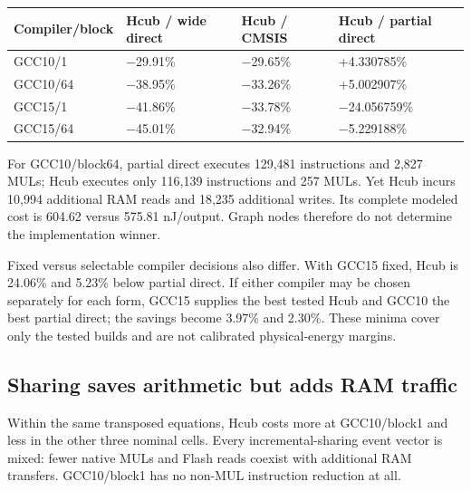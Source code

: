 \documentclass[conference]{IEEEtran}
\makeatletter
\newenvironment{inlinetable}{\par\medskip\noindent\begin{minipage}{\columnwidth}\def\@captype{table}}{\end{minipage}\par\medskip}
\makeatother
\begin{document}
\begin{inlinetable}
\centering\footnotesize
\setlength{\tabcolsep}{2pt}
\caption{\(100(E_H/E_{named}-1)\). Both historical comparisons favor Hcub in all
four cells. The corrected comparison rejects \(H_R\) with two surviving
cells.}\label{tab:4}
\begin{tabularx}{\columnwidth}{@{}>{\raggedright\arraybackslash}X>{\raggedright\arraybackslash}X>{\raggedright\arraybackslash}X>{\raggedright\arraybackslash}X@{}}
\toprule
Compiler/block & Hcub / wide direct & Hcub / CMSIS & Hcub / partial direct \\
\midrule
GCC10/1 & −29.91\% & −29.65\% & +4.330785\% \\
GCC10/64 & −38.95\% & −33.26\% & +5.002907\% \\
GCC15/1 & −41.86\% & −33.78\% & −24.056759\% \\
GCC15/64 & −45.01\% & −32.94\% & −5.229188\% \\
\bottomrule
\end{tabularx}
\end{inlinetable}

For GCC10/block64, partial direct executes 129,481 instructions and
2,827 MULs; Hcub executes only 116,139 instructions and 257 MULs. Yet
Hcub incurs 10,994 additional RAM reads and 18,235 additional writes.
Its complete modeled cost is 604.62 versus 575.81 nJ/output. Graph nodes
therefore do not determine the implementation winner.

Fixed versus selectable compiler decisions also differ. With GCC15
fixed, Hcub is 24.06\% and 5.23\% below partial direct. If either
compiler may be chosen separately for each form, GCC15 supplies the best
tested Hcub and GCC10 the best partial direct; the savings become 3.97\%
and 2.30\%. These minima cover only the tested builds and are not
calibrated physical-energy margins.

\subsection{Sharing saves arithmetic but adds RAM traffic}\label{sharing-saves-arithmetic-but-adds-ram-traffic}

Within the same transposed equations, Hcub costs more at GCC10/block1
and less in the other three nominal cells. Every incremental-sharing
event vector is mixed: fewer native MULs and Flash reads coexist with
additional RAM transfers. GCC10/block1 has no non-MUL instruction
reduction at all.
\end{document}
